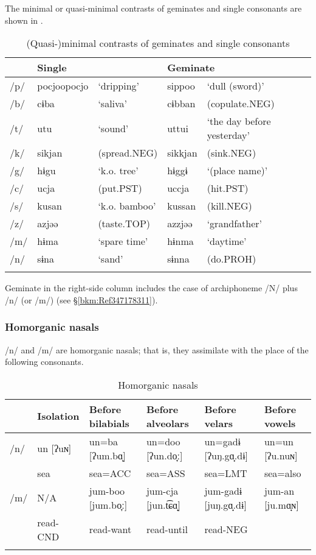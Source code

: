 The minimal or quasi-minimal contrasts of geminates and single consonants are shown in .

\begin{table}
\caption{(Quasi-)minimal contrasts of geminates and single consonants\label{tab:2:9}}
\begin{tabular}{ *{5}{l} } 
\lsptoprule
& \multicolumn{2}{l}{Single} &  \multicolumn{2}{l}{Geminate} \\\midrule
/p/ & pocjoopocjo & ‘dripping’ & sippoo & ‘dull (sword)’\\
/b/ & cɨba  & ‘saliva’ & cɨbban & (copulate.NEG)\\
/t/ & utu   & ‘sound’ & uttui & ‘the day before yesterday’\\
/k/ & sikjan & (spread.NEG) &  sikkjan & (sink.NEG)\\
/g/ & hɨgu & ‘k.o. tree’ &  hɨggɨ &  ‘(place name)’\\
/c/ & ucja  & (put.PST)  & uccja  & (hit.PST)\\
/s/ & kusan & ‘k.o. bamboo’ & kussan & (kill.NEG)\\
/z/ & azjəə & (taste.TOP) &  azzjəə & ‘grandfather’\\
/m/ & hɨma & ‘spare time’ & hɨnma & ‘daytime’\\
/n/ & sɨna   & ‘sand’ &  sɨnna &  (do.PROH)\\
\lspbottomrule
\end{tabular}
\end{table}

Geminate in the right-side column includes the case of archiphoneme /N/ plus /n/ (or /m/) (see §\ref{bkm:Ref347178311}).

\subsubsection{Homorganic nasals}

/n/ and /m/ are homorganic nasals; that is, they assimilate with the place of the following consonants.

\begin{table}\footnotesize
\caption{Homorganic nasals}
\begin{tabular}{ *{6}{l} } 
\lsptoprule
  & Isolation  &  Before bilabials &  Before alveolars&   Before velars &  Before vowels\\\midrule
 /n/  & un [ʔuɴ]  & un=ba [ʔum.bɑ̟] &  un=doo [ʔun.do̞ː]  & un=gadɨ [ʔuŋ.gɑ̟.dɨ]  & un=un [ʔu.nuɴ]\\
      &sea        & sea=ACC        &   sea=ASS          &  sea=LMT             & sea=also\\
 /m/  & N/A      & jum-boo [jum.bo̞ː]  & jum-cja [jun.t͡ɕɑ̟] &  jum-gadɨ [juŋ.gɑ̟.dɨ] &  jum-an [ju.mɑ̟ɴ]\\
      & read-CND &  read-want  & read-until &  read-NEG\\
\lspbottomrule
\end{tabular}
\end{table}

